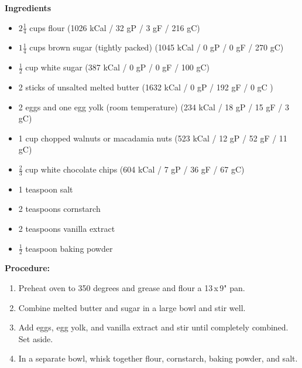 \documentclass{report}
\begin{document}


\bigskip

\bigskip

\begin{multicols}{2}
\textbf{Ingredients}
\begin{itemize}
\item $2\frac{1}{4}$ cups flour \quad (1026 kCal / 32 gP / 3 gF / 216 gC)
\item $1\frac{1}{4}$ cups brown sugar (tightly packed) \newline (1045 kCal / 0 gP / 0 gF / 270 gC)
\item $\frac{1}{2}$ cup white sugar \quad (387 kCal / 0 gP / 0 gF / 100 gC)
\item 2 sticks of unsalted melted butter \newline (1632 kCal / 0 gP / 192 gF / 0 gC )
\item 2 eggs and one egg yolk (room temperature)  \newline (234 kCal / 18 gP / 15 gF / 3 gC)
\item 1 cup chopped walnuts or macadamia nuts \newline (523 kCal / 12 gP / 52 gF / 11 gC)
\item $\frac{2}{3}$ cup white chocolate chips \newline (604 kCal / 7 gP / 36 gF / 67 gC)
\item 1 teaspoon salt
\item 2 teaspoons cornstarch 
\item 2 teaspoons vanilla extract 
\item $\frac{1}{2}$ teaspoon baking powder




\end{itemize}


\columnbreak
\textbf{Procedure:}
\medskip


\begin{enumerate}
\item Preheat oven to 350 degrees and grease and flour a 13\,x\,9" pan. 


\medskip
\item Combine melted butter and sugar in a large bowl and stir well.
\medskip

\medskip
\item Add eggs, egg yolk, and vanilla extract and stir until completely combined. Set aside.
\medskip

\medskip
\item In a separate bowl, whisk together flour, cornstarch, baking powder, and salt.
\medskip


\end{enumerate}
\end{multicols}
\end{document}
